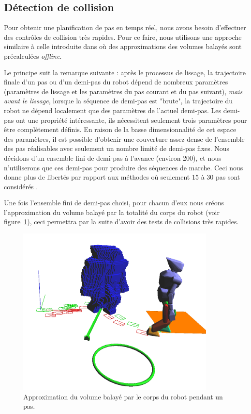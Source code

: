 \subsection{Détection de collision}
\label{sub:PQP}

Pour obtenir une planification de pas en temps réel, nous avons besoin d'effectuer des contrôles de collision très rapides.
Pour ce faire, nous utilisons une approche similaire à celle introduite dans \cite{perrin:TRO:2011} où des approximations des volumes balayés sont précalculées \emph{offline}.

Le principe suit la remarque suivante : après le processus de lissage, la trajectoire finale d'un pas ou d'un demi-pas du robot dépend de nombreux paramètres (paramètres de lissage et les paramètres du pas courant et du pas suivant), \emph{mais avant le lissage}, lorsque la séquence de demi-pas est "brute", la trajectoire du robot ne dépend localement que des paramètres de l'actuel demi-pas.
Les demi-pas ont une propriété intéressante, ils nécessitent seulement trois paramètres pour être complètement définis.
En raison de la basse dimensionnalité de cet espace des paramètres, il est possible d'obtenir une couverture assez dense de l'ensemble des pas réalisables avec seulement un nombre limité de demi-pas fixes.
Nous décidons d'un ensemble fini de demi-pas à l'avance (environ 200), et nous n'utiliserons que ces demi-pas pour produire des séquences de marche.
Ceci nous donne plus de libertés par rapport aux méthodes où seulement 15 à 30 pas sont considérés \cite{Chestnutt:ICRA:2005,Chestnutt:IROS:2009}.


Une fois l'ensemble fini de demi-pas choisi, pour chacun d'eux nous créons l'approximation du volume balayé par la totalité du corps du robot (voir figure~\ref{fig:SV}), ceci permettra par la suite d'avoir des tests de collisions très rapides.

\begin{figure}[h]
\begin{center}
\includegraphics[width=10.0cm]{images/newSweptVolumes.png}
\caption{Approximation du volume balayé par le corps du robot pendant un pas.}
\label{fig:SV}
\end{center}
\end{figure}

